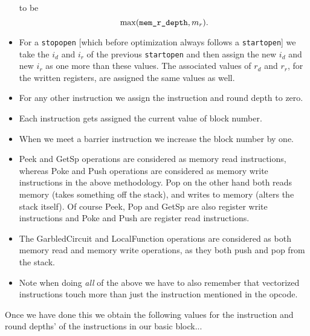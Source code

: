 \begin{itemize}
    to be
    \[ \max(\verb+mem_r_depth+, m_r). \]
  \item For a \verb+stopopen+ [which before optimization always follows a \verb+startopen+]
    we take the $i_d$ and $i_r$ of the previous \verb+startopen+ and then
    assign the new $i_d$ and new $i_r$ as one more than these values.
    The associated values of $r_d$ and $r_r$, for the written registers, are
    assigned the same values as well.
  \item For any other instruction we assign the instruction and round depth to zero.
  \item Each instruction gets assigned the current value of block number.
  \item When we meet a barrier instruction we increase the block number by one.
  \item Peek and GetSp operations are considered as memory read instructions, whereas
        Poke and Push operations are considered as memory write instructions in the above
        methodology.
        Pop on the other hand both reads memory (takes something off the stack),
        and writes to memory (alters the stack itself).
        Of course Peek, Pop and GetSp are also register write instructions and
        Poke and Push are register read instructions.
  \item The GarbledCircuit and LocalFunction operations are considered as both
        memory read and memory write operations, as they both push and pop from
        the stack.
  \item Note when doing {\em all} of the above we have to also remember that vectorized
        instructions touch more than just the instruction mentioned in the opcode.
\end{itemize}
Once we have done this we obtain the following values for the instruction and
round depths' of the instructions in our basic block...
